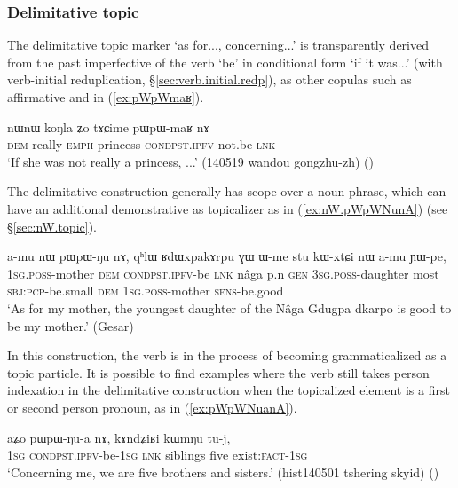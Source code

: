   \subsubsection{Delimitative topic} \label{sec:delimitative}
The delimitative topic marker  `as for..., concerning...' is transparently derived from the past imperfective of the verb `be' in conditional form `if it was...' (with verb-initial reduplication, §\ref{sec:verb.initial.redp}), as other copulas such as affirmative  and  in (\ref{ex:pWpWmaʁ}).

\begin{exe}
\ex \label{ex:pWpWmaʁ}
\gll nɯnɯ koŋla ʑo tɤɕime pɯ\redp{}pɯ-maʁ nɤ \\
\textsc{dem} really \textsc{emph} princess \textsc{cond}\redp{}\textsc{pst}.\textsc{ipfv}-not.be \textsc{lnk} \\
\glt `If she was not really a princess, ...' (140519 wandou gongzhu-zh) ()
\end{exe}

The delimitative construction generally has scope over a noun phrase, which can have an additional demonstrative  as topicalizer as in (\ref{ex:nW.pWpWNunA}) (see §\ref{sec:nW.topic}).

\begin{exe}
\ex \label{ex:nW.pWpWNunA}
\gll a-mu nɯ pɯ\redp{}pɯ-ŋu nɤ, qʰlɯ ʁdɯxpakɤrpu ɣɯ ɯ-me stu kɯ-xtɕi nɯ a-mu ɲɯ-pe, \\
\textsc{1sg}.\textsc{poss}-mother \textsc{dem} \textsc{cond}\redp{}\textsc{pst}.\textsc{ipfv}-be \textsc{lnk} nâga p.n \textsc{gen} \textsc{3sg}.\textsc{poss}-daughter most \textsc{sbj}:\textsc{pcp}-be.small \textsc{dem} \textsc{1sg}.\textsc{poss}-mother \textsc{sens}-be.good \\
\glt `As for my mother, the youngest daughter of the Nâga Gdugpa dkarpo is good to be my mother.' (Gesar)
\end{exe}

In this construction, the verb is in the process of becoming grammaticalized as a topic particle. It is possible to find examples where the verb still takes person indexation in the delimitative construction when the topicalized element is a first or second person pronoun, as in (\ref{ex:pWpWNuanA}). 

\begin{exe}
\ex \label{ex:pWpWNuanA}
\gll aʑo pɯ\redp{}pɯ-ŋu-a nɤ, kɤndʑiʁi kɯmŋu tu-j, \\
\textsc{1sg} \textsc{cond}\redp{}\textsc{pst}.\textsc{ipfv}-be-\textsc{1sg} \textsc{lnk} siblings five exist:\textsc{fact}-\textsc{1sg} \\
\glt `Concerning me, we are five brothers and sisters.' (hist140501 tshering skyid) 	()
\end{exe}

